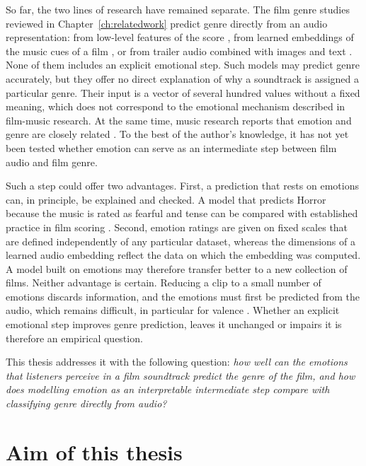 So far, the two lines of research have remained separate. The film genre studies reviewed in Chapter~\ref{ch:relatedwork} predict genre directly from an audio representation: from low-level features of the score \citep{austin2010characterization}, from learned embeddings of the music cues of a film \citep{ma2021computational}, or from trailer audio combined with images and text \citep{mangolin2020multimodal,behrouzi2023multimodal}. None of them includes an explicit emotional step. Such models may predict genre accurately, but they offer no direct explanation of why a soundtrack is assigned a particular genre. Their input is a vector of several hundred values without a fixed meaning, which does not correspond to the emotional mechanism described in film-music research. At the same time, music research reports that emotion and genre are closely related \citep{hu2007exploring,laurier2009mood,eerola2011genrespecific}. To the best of the author's knowledge, it has not yet been tested whether emotion can serve as an intermediate step between film audio and film genre.

Such a step could offer two advantages. First, a prediction that rests on emotions can, in principle, be explained and checked. A model that predicts Horror because the music is rated as fearful and tense can be compared with established practice in film scoring \citep{gorbman1987unheard}. Second, emotion ratings are given on fixed scales that are defined independently of any particular dataset, whereas the dimensions of a learned audio embedding reflect the data on which the embedding was computed. A model built on emotions may therefore transfer better to a new collection of films. Neither advantage is certain. Reducing a clip to a small number of emotions discards information, and the emotions must first be predicted from the audio, which remains difficult, in particular for valence \citep{kim2010music,kang2025there}. Whether an explicit emotional step improves genre prediction, leaves it unchanged or impairs it is therefore an empirical question.

This thesis addresses it with the following question: \emph{how well can the emotions that listeners perceive in a film soundtrack predict the genre of the film, and how does
modelling emotion as an interpretable intermediate step compare with classifying genre
directly from audio?}

\section{Aim of this thesis}
\label{sec:aim}

